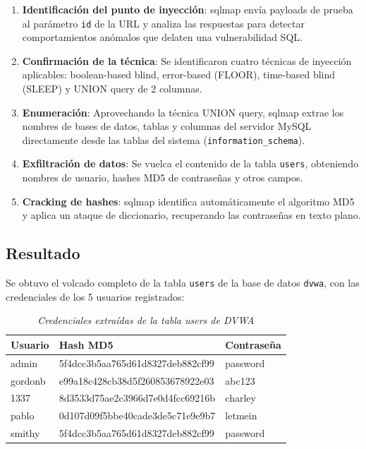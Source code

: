 \documentclass[12pt, letterpaper]{article}
\begin{document}
\begin{enumerate}
  \item \textbf{Identificación del punto de inyección}: sqlmap envía payloads de prueba al parámetro \texttt{id} de la URL y analiza las respuestas para detectar comportamientos anómalos que delaten una vulnerabilidad SQL.
  \item \textbf{Confirmación de la técnica}: Se identificaron cuatro técnicas de inyección aplicables: boolean-based blind, error-based (FLOOR), time-based blind (SLEEP) y UNION query de 2 columnas.
  \item \textbf{Enumeración}: Aprovechando la técnica UNION query, sqlmap extrae los nombres de bases de datos, tablas y columnas del servidor MySQL directamente desde las tablas del sistema (\texttt{information\_schema}).
  \item \textbf{Exfiltración de datos}: Se vuelca el contenido de la tabla \texttt{users}, obteniendo nombres de usuario, hashes MD5 de contraseñas y otros campos.
  \item \textbf{Cracking de hashes}: sqlmap identifica automáticamente el algoritmo MD5 y aplica un ataque de diccionario, recuperando las contraseñas en texto plano.
\end{enumerate}

\subsection{Resultado}

Se obtuvo el volcado completo de la tabla \texttt{users} de la base de datos \texttt{dvwa}, con las credenciales de los 5 usuarios registrados:

\begin{table}[H]
  \centering
  \caption{\textit{Credenciales extraídas de la tabla users de DVWA}}
  \begin{tabular}{@{}lll@{}}
    \toprule
    \textbf{Usuario} & \textbf{Hash MD5} & \textbf{Contraseña} \\
    \midrule
    admin   & 5f4dcc3b5aa765d61d8327deb882cf99 & password \\
    gordonb & e99a18c428cb38d5f260853678922e03 & abc123   \\
    1337    & 8d3533d75ae2c3966d7e0d4fcc69216b & charley  \\
    pablo   & 0d107d09f5bbe40cade3de5c71e9e9b7 & letmein  \\
    smithy  & 5f4dcc3b5aa765d61d8327deb882cf99 & password \\
    \bottomrule
  \end{tabular}
\end{table}
\end{document}
